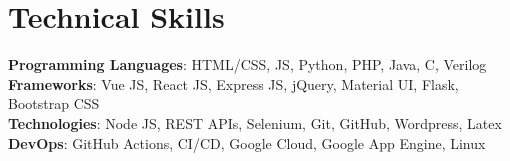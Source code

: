 \section{Technical Skills}
 \begin{itemize}[leftmargin=0.15in, label={}]
    \small{\item{
     \textbf{Programming Languages}{: HTML/CSS, JS, Python, PHP, Java, C, Verilog} \\
     \textbf{Frameworks}{: Vue JS, React JS, Express JS, jQuery, Material UI, Flask, Bootstrap CSS } \\
     \textbf{Technologies}{: Node JS, REST APIs, Selenium, Git, GitHub, Wordpress, Latex } \\
     \textbf{DevOps}{: GitHub Actions, CI/CD, Google Cloud, Google App Engine, Linux}
    }}
 \end{itemize} 